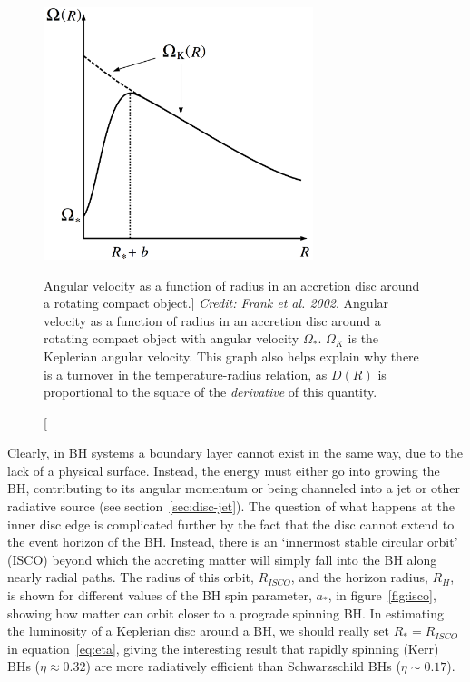 \begin{figure}
\centering
\includegraphics[width=0.7\textwidth]{figures/01-intro/omega.png}
\caption
[Angular velocity as a function of radius in an accretion disc around a rotating
compact object.]
{
{\sl Credit: Frank et al. 2002}.
Angular velocity as a function of radius in an accretion disc around a rotating
compact object with angular velocity $\Omega_*$. $\Omega_K$ is the Keplerian 
angular velocity. This graph
also helps explain why there is a turnover in the temperature-radius relation,
as $D(R)$ is proportional to the square of the {\em derivative} of this quantity.
} 
\label{fig:omega}
\end{figure}

Clearly, in BH systems a boundary layer cannot exist in the same way,
due to the lack of a physical surface. Instead, the energy must either go into
growing the BH, contributing to its angular momentum or being
channeled into a jet or other radiative source (see section~\ref{sec:disc-jet}).
The question of what happens at the inner disc edge
is complicated further by the fact that the disc cannot extend to the 
event horizon of the BH. Instead, there is an `innermost stable circular orbit' (ISCO)
beyond which the accreting matter will simply fall 
into the BH along nearly radial paths. The radius
of this orbit, $R_{ISCO}$, and the horizon radius, $R_H$,
is shown for different values of the BH spin parameter, $a_*$, 
in figure~\ref{fig:isco}, showing how matter can orbit closer to a prograde spinning BH. 
In estimating the luminosity of a Keplerian disc around a BH, 
we should really set $R_* = R_{ISCO}$ in equation~\ref{eq:eta}, 
giving the interesting result that rapidly spinning (Kerr) BHs ($\eta\approx0.32$)
are more radiatively efficient than Schwarzschild BHs ($\eta\sim0.17$).

